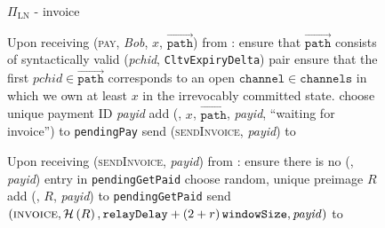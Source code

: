   \begin{figure}[H]
    \begin{protocolbox}{$\Pi_{\mathrm{LN}}$ - invoice}
      \begin{algorithmic}[1]
        \State Upon receiving (\textsc{pay}, \textit{Bob}, $x$,
        $\overrightarrow{\mathtt{path}}$) from \environment:
        \Indent
          \State ensure that $\overrightarrow{\mathtt{path}}$ consists of
          syntactically valid (\textit{pchid}, \texttt{CltvExpiryDelta}) pair
          \label{alg:protocol:pay:validpath}
          \State ensure that the first $\mathit{pchid} \in
          \overrightarrow{\mathtt{path}}$ corresponds to an open
          $\mathtt{channel} \in \mathtt{channels}$ in which we own at least $x$
          in the irrevocably committed state.
          \label{alg:protocol:pay:validchannel}
          \State choose unique payment ID \textit{payid} 
          \State add (\bob, $x$, $\overrightarrow{\mathtt{path}}$,
          \textit{payid}, ``waiting for invoice'') to \texttt{pendingPay}
          \State send (\textsc{sendInvoice}, \textit{payid}) to \bob{}
          \label{alg:protocol:pay:sendinvoice}
        \EndIndent
        \Statex

        \State Upon receiving (\textsc{sendInvoice}, \textit{payid}) from \bob:
        \Indent
          \State ensure there is no (\bob, \textit{payid}) entry in
          \texttt{pendingGetPaid}
          \State choose random, unique preimage $R$
          \State add (\bob, $R$, \textit{payid}) to \texttt{pendingGetPaid}
          \State send $\left(\textsc{invoice}, \mathcal{H}\left(R\right),
          \mathtt{relayDelay} + \left(2 + r\right)\texttt{windowSize}{}, \mathit{payid}\right)$ to
          \bob{}
        \EndIndent
        \Statex


\end{algorithmic}
\end{protocolbox}
\end{figure}
